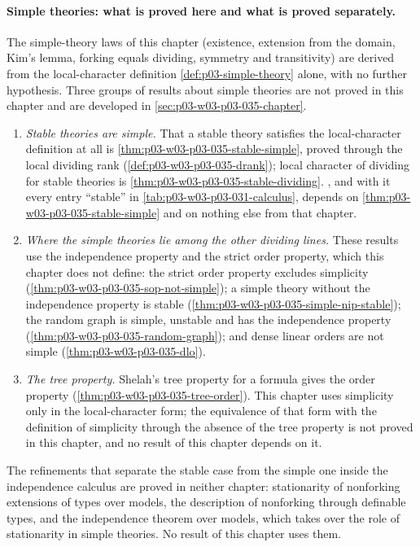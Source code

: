 \paragraph{Simple theories: what is proved here and what is proved
separately.}
The simple-theory laws of this chapter (existence, extension from the
domain, Kim's lemma, forking equals dividing, symmetry and transitivity)
are derived from the local-character definition
\cref{def:p03-simple-theory} alone, with no further hypothesis.  Three
groups of results about simple theories are not proved in this chapter
and are developed in \cref{sec:p03-w03-p03-035-chapter}.
\begin{enumerate}
  \item \emph{Stable theories are simple.}  That a stable theory satisfies
        the local-character definition at all is
        \cref{thm:p03-w03-p03-035-stable-simple}, proved through the local
        dividing rank (\cref{def:p03-w03-p03-035-drank}); local character
        of dividing for stable theories is
        \cref{thm:p03-w03-p03-035-stable-dividing}.
        , and with it every
        entry ``stable'' in \cref{tab:p03-w03-p03-031-calculus}, depends on
        \cref{thm:p03-w03-p03-035-stable-simple} and on nothing else from
        that chapter.
  \item \emph{Where the simple theories lie among the other dividing
        lines.}  These results use the independence property and the
        strict order property, which this chapter does not define: the
        strict order property excludes simplicity
        (\cref{thm:p03-w03-p03-035-sop-not-simple}); a simple theory
        without the independence property is stable
        (\cref{thm:p03-w03-p03-035-simple-nip-stable}); the random graph
        is simple, unstable and has the independence property
        (\cref{thm:p03-w03-p03-035-random-graph}); and dense linear orders
        are not simple (\cref{thm:p03-w03-p03-035-dlo}).
  \item \emph{The tree property.}  Shelah's tree property for a formula
        gives the order property
        (\cref{thm:p03-w03-p03-035-tree-order}).  This chapter uses
        simplicity only in the local-character form; the equivalence of
        that form with the definition of simplicity through the absence of
        the tree property is not proved in this chapter, and no result of
        this chapter depends on it.
\end{enumerate}
The refinements that separate the stable case from the simple one inside
the independence calculus are proved in neither chapter: stationarity of
nonforking extensions of types over models, the description of
nonforking through definable types, and the independence theorem over
models, which takes over the role of stationarity in simple theories.  No
result of this chapter uses them.
